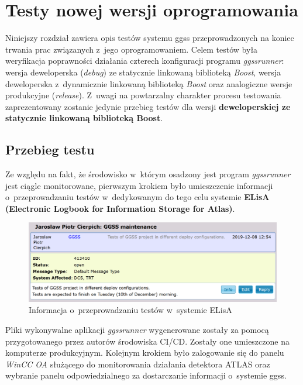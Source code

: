 \chapter{Testy nowej wersji oprogramowania}
\label{cha:test}
Niniejszy rozdział zawiera opis testów systemu \gls*{ggss} przeprowadzonych na koniec trwania prac związanych z~jego oprogramowaniem. Celem testów była weryfikacja poprawności działania czterech konfiguracji programu \textit{ggssrunner}: wersja deweloperska (\textit{debug}) ze statycznie linkowaną biblioteką \textit{Boost}, wersja deweloperska z~dynamicznie linkowaną biblioteką \textit{Boost} oraz analogiczne wersje produkcyjne (\textit{release}). Z~uwagi na powtarzalny charakter procesu testowania zaprezentowany zostanie jedynie przebieg testów dla wersji \textbf{deweloperskiej ze statycznie linkowaną biblioteką Boost}. 

\section{Przebieg testu}
Ze względu na fakt, że środowisko w~którym osadzony jest program \textit{ggssrunner} jest ciągle monitorowane, pierwszym krokiem było umieszczenie informacji o~przeprowadzaniu testów w~dedykowanym do tego celu systemie \textbf{ELisA (Electronic Logbook for Information Storage for Atlas)}.

\begin{figure}[H]
\centering
\includegraphics[width=\textwidth]{res/png/elisa}
\caption{Informacja o~przeprowadzaniu testów w~systemie ELisA}
\label{fig:elisa}
\end{figure}

Pliki wykonywalne aplikacji \textit{ggssrunner} wygenerowane zostały za pomocą przygotowanego przez autorów środowiska CI/CD. Zostały one umieszczone na komputerze produkcyjnym. Kolejnym krokiem było zalogowanie się do panelu \textit{WinCC OA} służącego do monitorowania działania detektora ATLAS oraz wybranie panelu odpowiedzialnego za dostarczanie informacji o~systemie \gls*{ggss}. 

